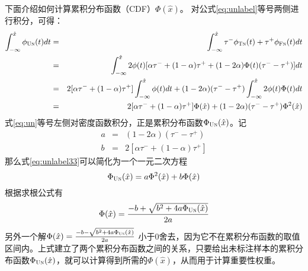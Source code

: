 下面介绍如何计算累积分布函数（CDF）$\Phi (\hat{x})$。
对公式\eqref{eq:unlabel}等号两侧进行积分，可得：
\begin{eqnarray}
\int_{-\infty}^{\hat x}  \phi_{\textsc{Un}}(t) dt 
	&=& \int_{-\infty}^{\hat x} \tau^-\phi_{\textsc{Tn}}(t) +\tau^+\phi_{\textsc{Fn}}(t) dt \label{eq:un}\\
	&=& \int_{-\infty}^{\hat x} 2\phi(t)[\alpha\tau^- + (1- \alpha)\tau^+  + (1-2\alpha)\Phi(t)(\tau^- -\tau^+)] dt\nonumber\\ 
	&=&  2[\alpha\tau^- + (1- \alpha)\tau^+]\int_{-\infty}^{\hat x} \phi(t) dt + (1-2\alpha)(\tau^- -\tau^+)\int_{-\infty}^{\hat x} 2 \phi(t) \Phi(t) dt \nonumber\\
	&=& 2[\alpha\tau^- + (1- \alpha)\tau^+] \Phi(\hat{x}) + (1-2\alpha)(\tau^- -\tau^+)\Phi^2(\hat{x}) \label{eq:unlabel33}
\end{eqnarray}
式\eqref{eq:un}等号左侧对密度函数积分，正是累积分布函数$\Phi_{\textsc{Un}}(\hat{x})$。记
\begin{eqnarray}
	a &=&  (1-2\alpha)(\tau^- -\tau^+)\nonumber \\
	b &=& 2[\alpha\tau^- + (1- \alpha)\tau^+] \nonumber
\end{eqnarray}
那么式\eqref{eq:unlabel33}可以简化为一个一元二次方程
\[\Phi_{\textsc{Un}}(\hat{x})= a\Phi^2(\hat{x}) + b\Phi(\hat{x})\]
根据求根公式有
\begin{eqnarray}\label{eq:Phi}
	\Phi(\hat{x}) = \frac{-b+\sqrt{b^2+4a\Phi_{\textsc{Un}}(\hat{x})}}{2a}
\end{eqnarray}
另外一个解$\Phi(\hat{x}) = \frac{-b-\sqrt{b^2+4a\Phi_{\textsc{Un}}(\hat{x})}}{2a}$ 小于0舍去，因为它不在累积分布函数的取值区间内。上式建立了两个累积分布函数之间的关系，只要给出未标注样本的累积分布函数$\Phi_{\textsc{Un}}(\hat{x})$，就可以计算得到所需的$\Phi(\hat{x})$，从而用于计算重要性权重。

